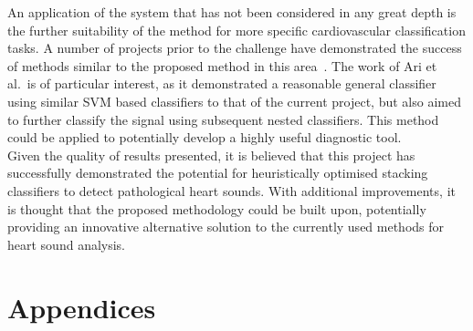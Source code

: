\documentclass[titlepage, 12pt]{scrartcl} \usepackage{enumitem}
\begin{document}
An application of the system that has not been considered in any great depth is
the further suitability of the method for more specific cardiovascular
classification tasks. A number of projects prior to the challenge have
demonstrated the success of methods similar to the proposed method in this
area~\parencite{Ari2010, Quiceno-Manrique2010a}. The work of Ari et al.\ is
of particular interest, as it demonstrated a reasonable general classifier
using similar SVM based classifiers to that of the current project, but also
aimed to further classify the signal using subsequent nested classifiers. This
method could be applied to potentially develop a highly useful diagnostic tool.\\

Given the quality of results presented, it is believed that this project has
successfully demonstrated the potential for heuristically optimised stacking
classifiers to detect pathological heart sounds. With additional improvements,
it is thought that the proposed methodology could be built upon, potentially
providing an innovative alternative solution to the currently used methods for
heart sound analysis.

\pagebreak

\appendix
\section*{Appendices}
\renewcommand{\thesubsection}{\Alph{subsection}}
\end{document}
